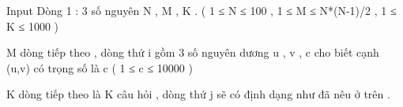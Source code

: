 Input
Dòng 1 : 3 số nguyên N , M , K . ( 1 ≤ N ≤ 100 , 1 ≤ M ≤ N*(N-1)/2  , 1 ≤ K ≤ 1000 )   


   M dòng tiếp theo , dòng thứ i gồm 3 số nguyên dương u , v , c cho biết cạnh (u,v) có trọng số là c ( 1 ≤ c ≤ 10000 )   


   K dòng tiếp theo là K câu hỏi , dòng thứ j sẽ có định dạng như đã nêu ở trên .